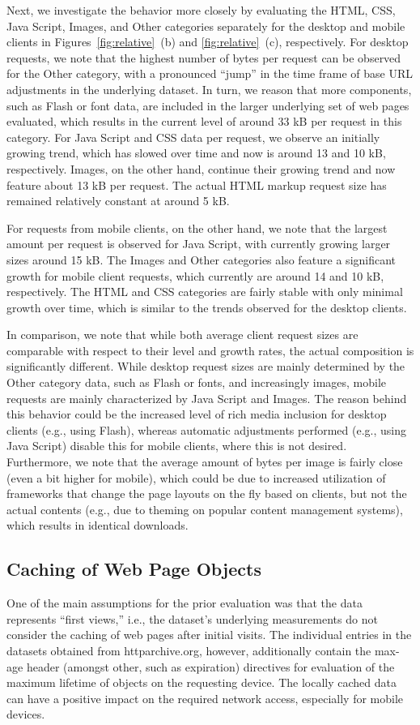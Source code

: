 \documentclass[onecolumn,12pt]{IEEEtran}
\begin{document}
Next, we investigate the behavior more closely by evaluating the HTML, CSS, Java Script, Images, and Other categories separately for the desktop and mobile clients in Figures~\ref{fig:relative}~(b) and \ref{fig:relative}~(c), respectively.
For desktop requests, we note that the highest number of bytes per request can be observed for the Other category, with a pronounced ``jump'' in the time frame of base URL adjustments in the underlying dataset. 
In turn, we reason that more components, such as Flash or font data, are included in the larger underlying set of web pages evaluated, which results in the current level of around 33 kB per request in this category.
For Java Script and CSS data per request, we observe an initially growing trend, which has slowed over time and now is around 13 and 10 kB, respectively.
Images, on the other hand, continue their growing trend and now feature about 13 kB per request.
The actual HTML markup request size has remained relatively constant at around 5 kB.

For requests from mobile clients, on the other hand, we note that the largest amount per request is observed for Java Script, with currently growing larger sizes around 15 kB.
The Images and Other categories also feature a significant growth for mobile client requests, which currently are around 14 and 10 kB, respectively.
The HTML and CSS categories are fairly stable with only minimal growth over time, which is similar to the trends observed for the desktop clients.

In comparison, we note that while both average client request sizes are comparable with respect to their level and growth rates, the actual composition is significantly different. 
While desktop request sizes are mainly determined by the Other category data, such as Flash or fonts, and increasingly images, mobile requests are mainly characterized by Java Script and Images.
The reason behind this behavior could be the increased level of rich media inclusion for desktop clients (e.g., using Flash), whereas automatic adjustments performed (e.g., using Java Script) disable this for mobile clients, where this is not desired. Furthermore, we note that the average amount of bytes per image is fairly close (even a bit higher for mobile), which could be due to increased utilization of frameworks that change the page layouts on the fly based on clients, but not the actual contents (e.g., due to theming on popular content management systems), which results in identical downloads.

\subsection{Caching of Web Page Objects}
One of the main assumptions for the prior evaluation was that the data represents ``first views,'' i.e., the dataset's underlying measurements do not consider the caching of web pages after initial visits. 
The individual entries in the datasets obtained from httparchive.org, however, additionally contain the max-age header (amongst other, such as expiration) directives for evaluation of the maximum lifetime of objects on the requesting device. The locally cached data can have a positive impact on the required network access, especially for mobile devices.
\end{document}
